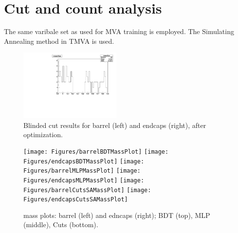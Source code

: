 \section{Cut and count analysis}


The same varibale set as used for MVA training is employed.
The Simulating Annealing method in TMVA is used.




\begin{figure}[!h]
  \centering
  \includegraphics[width=0.45\textwidth]{Figures/cnt/SA_barrel_mass_opt}
\caption{Blinded cut results for barrel (left) and endcaps (right), after optimization.}
\end{figure}


%


\newpage



\begin{figure}[!h]
  \centering
  \texttt{[image: Figures/barrelBDTMassPlot]}
  \texttt{[image: Figures/endcapsBDTMassPlot]}
  \texttt{[image: Figures/barrelMLPMassPlot]}
  \texttt{[image: Figures/endcapsMLPMassPlot]}
  \texttt{[image: Figures/barrelCutsSAMassPlot]}
  \texttt{[image: Figures/endcapsCutsSAMassPlot]}
  \caption{mass plots: barrel (left) and edncaps (right); BDT (top), MLP (middle), Cuts (bottom).}
\end{figure}

